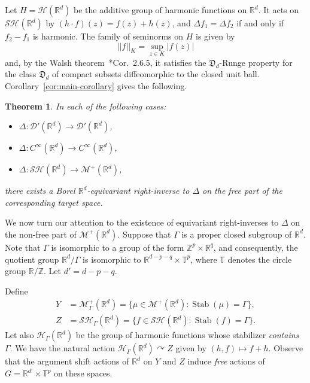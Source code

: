\documentclass[12pt]{paper}
\numberwithin{equation}{section}
\theoremstyle{plain}
\newtheorem{theorem}{Theorem}[section]
\theoremstyle{definition}
\newcommand{\R}{\mathbb{R}}
\newcommand{\Rd}{\mathbb{R}^{d}}
\newcommand{\T}{\mathbb{T}}
\newcommand{\Z}{\mathbb{Z}}
\newcommand{\mfD}{\mathfrak{D}}
\newcommand{\smooth}[2][]{C^{\infty}_{#1}(#2)}
\newcommand{\measp}[2][]{\mathcal{M}_{#1}^+(#2)}
\newcommand{\distrib}[1]{\mathscr{D}'(#1)}
\newcommand{\harm}[2][]{\mathcal{H}_{#1}(#2)}
\newcommand{\sharm}[2][]{\mathcal{SH}_{#1}(#2)}
\DeclareMathOperator{\stab}{\mathrm{Stab}}
\newcommand{\acts}{\curvearrowright}
\newcommand{\norm}[1]{||#1||}
\begin{document}
Let \(H = \harm{\Rd}\) be the additive group of harmonic functions on \(\Rd\).  It acts on
\(\sharm{\Rd}\) by \((h \cdot f)(z) = f(z) + h(z)\), and \(\Delta f_{1} = \Delta f_{2}\) if and only
if \(f_{2} - f_{1}\) is harmonic.  The family of seminorms on \(H\) is given by
\[\norm{f}_{K} = \sup_{z \in K}|f(z)|\]
and, by the Walsh theorem~\cite{armitageClassicalPotentialTheory2001}*{Cor.~2.6.5}, it satisfies the
\(\mfD_{d}\)-Runge property for the class \(\mfD_{d}\) of compact subsets diffeomorphic to the closed
unit ball.  Corollary~\ref{cor:main-corollary} gives the following.

\begin{theorem}
  \label{thm:equivariant-poisson}
In each of the following cases:
\begin{itemize}[itemsep=-2pt]
\item[{\rm (i)}]\( \Delta\colon \distrib{\Rd} \to \distrib{\Rd} \),

\item[{\rm (ii)}]\(\Delta: \smooth{\Rd} \to \smooth{\Rd}\),

\item[{\rm (iii)}]\(\Delta: \sharm{\Rd} \to \measp{\Rd}\),
\end{itemize}
\noindent
there exists a Borel \(\Rd\)-equivariant
right-inverse to \(\Delta\) on the free part of the corresponding target space.
\end{theorem}

We now turn our attention to the existence of equivariant right-inverses to \(\Delta\) on the
non-free part of \(\measp{\Rd}\).  Suppose that \(\Gamma\) is a proper closed subgroup of \(\Rd\).
Note that \(\Gamma\) is isomorphic to a group of the form \(\Z^{p} \times \R^{q}\), and
consequently, the quotient group \(\Rd/\Gamma\) is isomorphic to \(\R^{d-p-q} \times \T^{p}\),
where \(\T\) denotes the circle group \(\R/\Z\).  Let \(d' = d - p -q\).

Define
\begin{displaymath}
  \begin{aligned}
    Y &= \measp[\Gamma]{\Rd} = \{\mu \in \measp{\Rd} : \stab(\mu) = \Gamma\}, \\
    Z &= \sharm[\Gamma]{\Rd} = \{f \in \sharm{\Rd} : \stab(f) = \Gamma\}.
  \end{aligned}
\end{displaymath}
Let also \(\harm[\Gamma]{\Rd}\) be the group of harmonic functions whose stabilizer
\emph{contains}~\(\Gamma\).  We have the natural action \(\harm[\Gamma]{\Rd} \acts Z\) given by
\((h,f) \mapsto f + h\).  Observe that the argument shift actions of \(\Rd\) on \(Y\) and \(Z\)
induce \emph{free} actions of \(G = \R^{d'} \times \T^{p}\) on these spaces.
\end{document}
